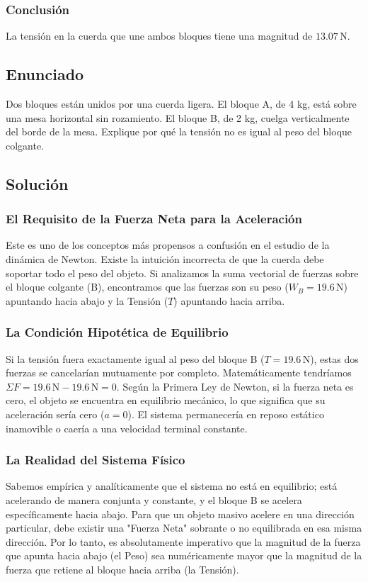 \documentclass[12pt]{article}
\begin{document}
\subsubsection*{Conclusión}
La tensión en la cuerda que une ambos bloques tiene una magnitud de $13.07 \, \text{N}$.

\newpage

\subsection*{Enunciado}
Dos bloques están unidos por una cuerda ligera. El bloque A, de 4 kg, está sobre una mesa horizontal sin rozamiento. El bloque B, de 2 kg, cuelga verticalmente del borde de la mesa. Explique por qué la tensión no es igual al peso del bloque colgante.

\subsection*{Solución}

\subsubsection*{El Requisito de la Fuerza Neta para la Aceleración}
Este es uno de los conceptos más propensos a confusión en el estudio de la dinámica de Newton. Existe la intuición incorrecta de que la cuerda debe soportar todo el peso del objeto. Si analizamos la suma vectorial de fuerzas sobre el bloque colgante (B), encontramos que las fuerzas son su peso ($W_B = 19.6 \, \text{N}$) apuntando hacia abajo y la Tensión ($T$) apuntando hacia arriba.

\subsubsection*{La Condición Hipotética de Equilibrio}
Si la tensión fuera exactamente igual al peso del bloque B ($T = 19.6 \, \text{N}$), estas dos fuerzas se cancelarían mutuamente por completo. Matemáticamente tendríamos $\Sigma F = 19.6 \, \text{N} - 19.6 \, \text{N} = 0$. Según la Primera Ley de Newton, si la fuerza neta es cero, el objeto se encuentra en equilibrio mecánico, lo que significa que su aceleración sería cero ($a = 0$). El sistema permanecería en reposo estático inamovible o caería a una velocidad terminal constante.

\subsubsection*{La Realidad del Sistema Físico}
Sabemos empírica y analíticamente que el sistema no está en equilibrio; está acelerando de manera conjunta y constante, y el bloque B se acelera específicamente hacia abajo. Para que un objeto masivo acelere en una dirección particular, debe existir una "Fuerza Neta" sobrante o no equilibrada en esa misma dirección. Por lo tanto, es absolutamente imperativo que la magnitud de la fuerza que apunta hacia abajo (el Peso) sea numéricamente mayor que la magnitud de la fuerza que retiene al bloque hacia arriba (la Tensión).
\end{document}

